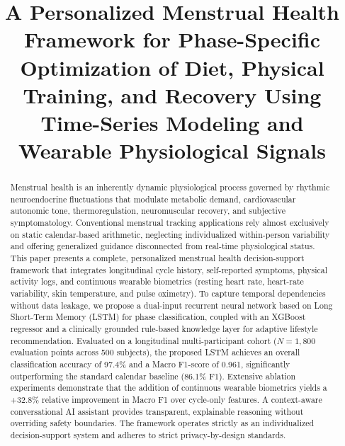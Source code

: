 \documentclass[conference]{IEEEtran}
\begin{document}
\title{A Personalized Menstrual Health Framework for Phase-Specific Optimization of Diet, Physical Training, and Recovery Using Time-Series Modeling and Wearable Physiological Signals}

\author{
\and
{}
}

\maketitle

\begin{abstract}
Menstrual health is an inherently dynamic physiological process governed by rhythmic neuroendocrine fluctuations that modulate metabolic demand, cardiovascular autonomic tone, thermoregulation, neuromuscular recovery, and subjective symptomatology. Conventional menstrual tracking applications rely almost exclusively on static calendar-based arithmetic, neglecting individualized within-person variability and offering generalized guidance disconnected from real-time physiological status. This paper presents a complete, personalized menstrual health decision-support framework that integrates longitudinal cycle history, self-reported symptoms, physical activity logs, and continuous wearable biometrics (resting heart rate, heart-rate variability, skin temperature, and pulse oximetry). To capture temporal dependencies without data leakage, we propose a dual-input recurrent neural network based on Long Short-Term Memory (LSTM) for phase classification, coupled with an XGBoost regressor and a clinically grounded rule-based knowledge layer for adaptive lifestyle recommendation. Evaluated on a longitudinal multi-participant cohort ($N = 1{,}800$ evaluation points across 500 subjects), the proposed LSTM achieves an overall classification accuracy of 97.4\% and a Macro F1-score of 0.961, significantly outperforming the standard calendar baseline (86.1\% F1). Extensive ablation experiments demonstrate that the addition of continuous wearable biometrics yields a +32.8\% relative improvement in Macro F1 over cycle-only features. A context-aware conversational AI assistant provides transparent, explainable reasoning without overriding safety boundaries. The framework operates strictly as an individualized decision-support system and adheres to strict privacy-by-design standards.
\end{abstract}
\end{document}

